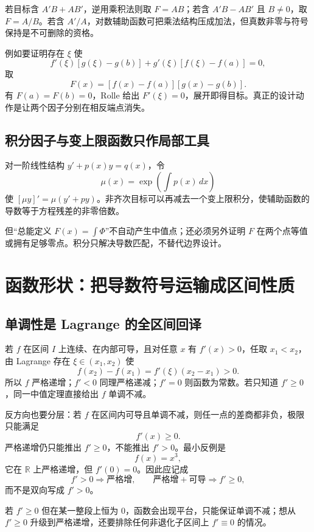 \documentclass[UTF8,fontset=none,11pt,a4paper]{ctexart}
\begin{document}
若目标含 $A'B+AB'$，逆用乘积法则取 $F=AB$；若含 $A'B-AB'$ 且 $B\ne0$，取 $F=A/B$。若含 $A'/A$，对数辅助函数可把乘法结构压成加法，但真数非零与符号保持是不可删除的资格。

例如要证明存在 $\xi$ 使
\[
f'(\xi)[g(\xi)-g(b)]+g'(\xi)[f(\xi)-f(a)]=0,
\]
取
\[
F(x)=[f(x)-f(a)][g(x)-g(b)].
\]
有 $F(a)=F(b)=0$，Rolle 给出 $F'(\xi)=0$，展开即得目标。真正的设计动作是让两个因子分别在相反端点消失。

\subsection{积分因子与变上限函数只作局部工具}

对一阶线性结构 $y'+p(x)y=q(x)$，令
\[
\mu(x)=\exp\left(\int p(x)\,dx\right)
\]
使 $[\mu y]'=\mu(y'+py)$。非齐次目标可以再减去一个变上限积分，使辅助函数的导数等于方程残差的非零倍数。

但“总能定义 $F(x)=\int\Phi$”不自动产生中值点；还必须另外证明 $F$ 在两个点等值或拥有足够零点。积分只解决导数匹配，不替代边界设计。

\section{函数形状：把导数符号运输成区间性质}

\subsection{单调性是 Lagrange 的全区间回译}

若 $f$ 在区间 $I$ 上连续、在内部可导，且对任意 $x$ 有 $f'(x)>0$，任取 $x_1<x_2$，由 Lagrange 存在 $\xi\in(x_1,x_2)$ 使
\[
f(x_2)-f(x_1)=f'(\xi)(x_2-x_1)>0.
\]
所以 $f$ 严格递增；$f'<0$ 同理严格递减；$f'=0$ 则函数为常数。若只知道 $f'\ge0$，同一中值定理直接给出 $f$ 单调不减。

反方向也要分层：若 $f$ 在区间内可导且单调不减，则任一点的差商都非负，极限只能满足
\[
\boxed{f'(x)\ge0}.
\]
严格递增仍只能推出 $f'\ge0$，不能推出 $f'>0$。最小反例是
\[
f(x)=x^3,
\]
它在 $\mathbb R$ 上严格递增，但 $f'(0)=0$。因此应记成
\[
\boxed{f'>0\Rightarrow\text{严格增},\qquad \text{严格增}+\text{可导}\Rightarrow f'\ge0,}
\]
而不是双向写成 $f'>0$。

若 $f'\ge0$ 但在某一整段上恒为 $0$，函数会出现平台，只能保证单调不减；想从 $f'\ge0$ 升级到严格递增，还要排除任何非退化子区间上 $f'\equiv0$ 的情况。
\end{document}
